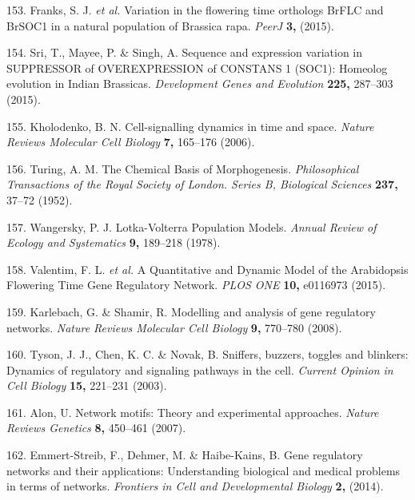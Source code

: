 \documentclass[12pt,]{book}
\begin{document}
\hypertarget{ref-franks_variation_2015}{}
153. Franks, S. J. \emph{et al.} Variation in the flowering time
orthologs BrFLC and BrSOC1 in a natural population of Brassica rapa.
\emph{PeerJ} \textbf{3,} (2015).

\hypertarget{ref-sri_sequence_2015}{}
154. Sri, T., Mayee, P. \& Singh, A. Sequence and expression variation
in SUPPRESSOR of OVEREXPRESSION of CONSTANS 1 (SOC1): Homeolog evolution
in Indian Brassicas. \emph{Development Genes and Evolution}
\textbf{225,} 287--303 (2015).

\hypertarget{ref-kholodenko_cell_signalling_2006}{}
155. Kholodenko, B. N. Cell-signalling dynamics in time and space.
\emph{Nature Reviews Molecular Cell Biology} \textbf{7,} 165--176
(2006).

\hypertarget{ref-turing_chemical_1952}{}
156. Turing, A. M. The Chemical Basis of Morphogenesis.
\emph{Philosophical Transactions of the Royal Society of London. Series
B, Biological Sciences} \textbf{237,} 37--72 (1952).

\hypertarget{ref-wangersky_lotka_volterra_1978}{}
157. Wangersky, P. J. Lotka-Volterra Population Models. \emph{Annual
Review of Ecology and Systematics} \textbf{9,} 189--218 (1978).

\hypertarget{ref-valentim_quantitative_2015}{}
158. Valentim, F. L. \emph{et al.} A Quantitative and Dynamic Model of
the Arabidopsis Flowering Time Gene Regulatory Network. \emph{PLOS ONE}
\textbf{10,} e0116973 (2015).

\hypertarget{ref-karlebach_modelling_2008}{}
159. Karlebach, G. \& Shamir, R. Modelling and analysis of gene
regulatory networks. \emph{Nature Reviews Molecular Cell Biology}
\textbf{9,} 770--780 (2008).

\hypertarget{ref-tyson_sniffers_2003}{}
160. Tyson, J. J., Chen, K. C. \& Novak, B. Sniffers, buzzers, toggles
and blinkers: Dynamics of regulatory and signaling pathways in the cell.
\emph{Current Opinion in Cell Biology} \textbf{15,} 221--231 (2003).

\hypertarget{ref-alon_network_2007}{}
161. Alon, U. Network motifs: Theory and experimental approaches.
\emph{Nature Reviews Genetics} \textbf{8,} 450--461 (2007).

\hypertarget{ref-emmert_streib_gene_2014}{}
162. Emmert-Streib, F., Dehmer, M. \& Haibe-Kains, B. Gene regulatory
networks and their applications: Understanding biological and medical
problems in terms of networks. \emph{Frontiers in Cell and Developmental
Biology} \textbf{2,} (2014).
\end{document}

